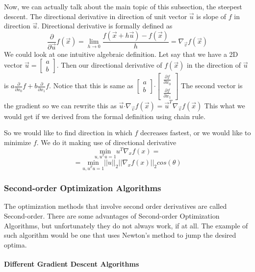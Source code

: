 \documentclass[paper=a4, fontsize=11pt]{scrartcl}
\numberwithin{equation}{section}		%
\numberwithin{figure}{section}			%
\numberwithin{table}{section}			%
\begin{document}
 Now, we can actually talk about the main topic of this subsection, the steepest descent. The directional derivative in direction of unit vector $\vec{u}$ is slope of $f$ in direction $\vec{u}$. Directional derivative is formally defined as $$ \frac{\partial}{\partial \vec{u}} f(\vec{x}) = \lim_{h\to0} \frac{f(\vec{x} + h\vec{u}) - f(\vec{x})}{h} = \nabla_{\vec{v}} f(\vec{x})$$
We could look at one intuitive algebraic definition. Let say that we have a 2D vector $\vec{u} = \begin{bmatrix} a \\ b \end{bmatrix}$. Then our directional derivative of $f(\vec{x})$ in the direction of $\vec{u}$ is $a\frac{\partial}{\partial x_0}f + b\frac{\partial}{\partial x_1}f$. Notice that this is same as $\begin{bmatrix} a \\ b \end{bmatrix} \boldsymbol{\cdot} \begin{bmatrix} \frac{\partial f}{\partial x_0} \\  \frac{\partial f}{\partial x_1} \end{bmatrix} $ The second vector is the gradient so we can rewrite this as $\vec{u} \boldsymbol{\cdot} \nabla_{\vec{v}} f(\vec{x}) = \vec{u}^T \nabla_{\vec{v}} f(\vec{x}) $ This what we would get if we derived from the formal definition using chain rule.  \par
So we would like to find direction in which $f$ decreases fastest, or we would like to minimize $f$. We do it making use of directional derivative 
$$\underset{u,u^Tu=1}{\text{min}} u^T\nabla_x f(x) =$$
$$ = \underset{u,u^Tu=1}{\text{min}} ||u||_2||\nabla_x f(x)||_2cos(\theta) $$


	\subsubsection{Second-order Optimization Algorithms}
	The optimization methods that involve second order derivatives are called Second-order. There are some advantages of Second-order Optimization Algorithms, but unfortunately they do not always work, if at all. The example of such algorithm would be one that uses Newton's method to jump the desired optima. 
	
	\paragraph{Different Gradient Descent Algorithms}
	
\end{document}
